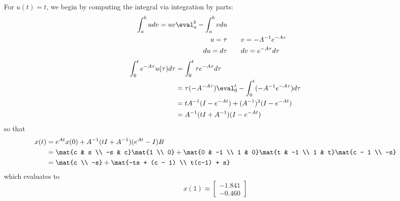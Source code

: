 \documentclass{homework}
\begin{document}
\begin{letterenum}
    \item For $u(t) = t$, we begin by computing the integral via
    integration by parts:
    \begin{align}
        \int_a^b udv = uv \eval_a^b - \int_{a}^{b} vdu \\
        u = \tau & \qquad v = -A^{-1} e^{-A\tau} \\
        du = d\tau &\qquad dv = e^{-A\tau}d\tau
    \end{align}
    \begin{align}
        \convu &= \int_{0}^{t} \tau e^{-A\tau}d\tau \\
            &= \tau(-A^{-A\tau})\eval_0^t - \int_{0}^{t} (-A^{-1} e^{-A\tau}) d\tau \\
            &= tA^{-1} (I - e^{-At}) + (A^{-1})^2 (I - e^{-At}) \\
            &= A^{-1} (tI + A^{-1}) (I - e^{-At})
    \end{align}
    so that
    \begin{align}
        x(t) &= e^{At}x(0) + A^{-1}(tI + A^{-1})(e^{At} - I)B \\
            &= \mat{c & s \\ -s & c}\mat{1 \\ 0} +
                \mat{0 & -1 \\ 1 & 0}\mat{t & -1 \\ 1 & t}\mat{c - 1 \\ -s} \\
            &= \mat{c \\ -s} + \mat{-ts + (c - 1) \\ t(c-1) + s}
    \end{align}
    which evaluates to 
    \begin{equation}
        \boxed{x(1) \approx \begin{bmatrix}
            -1.841 \\ -0.460
        \end{bmatrix}}
    \end{equation}


\end{letterenum}
\end{document}
